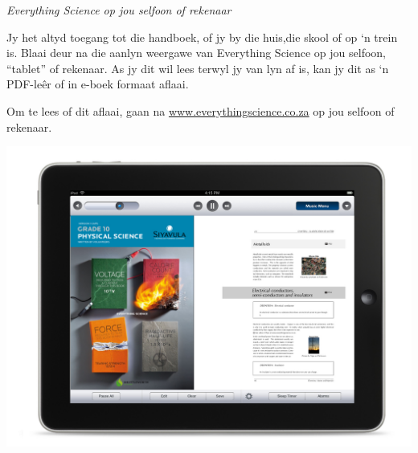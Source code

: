 \newpage
\thispagestyle{empty}

{\normalfont\sffamily\fontsize{22}\normalfont\itshape Everything Science op jou selfoon of rekenaar} \par

{\normalsize
Jy het altyd toegang  tot die handboek, of jy by die huis,die skool of op ‘n trein is. Blaai deur na die aanlyn weergawe van Everything Science op jou selfoon, “tablet” of rekenaar. As jy dit wil lees terwyl jy van lyn af is, kan jy dit as ‘n PDF-leêr of in e-boek formaat aflaai.\par


Om te lees of dit aflaai, gaan na \underline{www.everythingscience.co.za} op jou selfoon of rekenaar.} \vspace*{1cm}


\begin{center}
\begin{minipage}{0.6\textwidth}
\centering
\includegraphics[width=1\textwidth]{title_images/ipad.jpg}
\end{minipage}
\begin{minipage}{0.3\textwidth}
\centering

\end{minipage}
\end{center}
